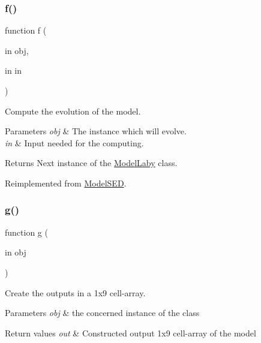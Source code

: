 \subsubsection{\texorpdfstring{f()}{f()}}
{\footnotesize\ttfamily function f (\begin{DoxyParamCaption}\item[{in}]{obj,  }\item[{in}]{in }\end{DoxyParamCaption})\hspace{0.3cm}{\ttfamily [virtual]}}



Compute the evolution of the model. 


\begin{DoxyParams}{Parameters}
{\em obj} & The instance which will evolve. \\
\hline
{\em in} & Input needed for the computing. \\
\hline
\end{DoxyParams}
\begin{DoxyReturn}{Returns}
Next instance of the \hyperlink{class_model_laby}{Model\+Laby} class. 
\end{DoxyReturn}


Reimplemented from \hyperlink{class_model_s_e_d_ac36f9451c43b120828af4380858f2024}{Model\+S\+ED}.

\mbox{\label{class_model_laby_a07dadfabe92bf9a144b8a862720e7746}} 
\subsubsection{\texorpdfstring{g()}{g()}}
{\footnotesize\ttfamily function g (\begin{DoxyParamCaption}\item[{in}]{obj }\end{DoxyParamCaption})\hspace{0.3cm}{\ttfamily [virtual]}}



Create the outputs in a 1x9 cell-\/array. 


\begin{DoxyParams}{Parameters}
{\em obj} & the concerned instance of the class \\
\hline
\end{DoxyParams}

\begin{DoxyRetVals}{Return values}
{\em out} & Constructed output 1x9 cell-\/array of the model \\
\hline
\end{DoxyRetVals}


